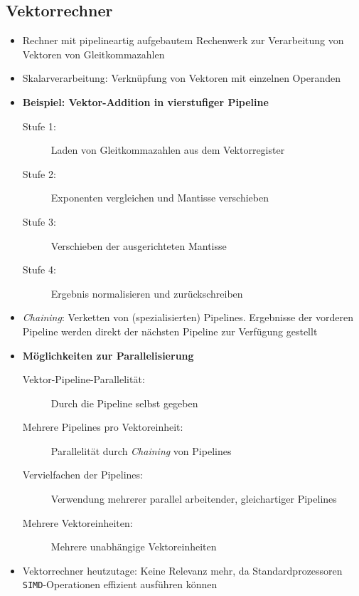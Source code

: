 \subsection{Vektorrechner}
\begin{itemize}
	\item Rechner mit pipelineartig aufgebautem Rechenwerk zur Verarbeitung von Vektoren von Gleitkommazahlen
	\item Skalarverarbeitung: Verknüpfung von Vektoren mit einzelnen Operanden
	\item \textbf{Beispiel: Vektor-Addition in vierstufiger Pipeline}
	\begin{description}
		\item[Stufe 1:] Laden von Gleitkommazahlen aus dem Vektorregister
		\item[Stufe 2:] Exponenten vergleichen und Mantisse verschieben
		\item[Stufe 3:] Verschieben der ausgerichteten Mantisse
		\item[Stufe 4:] Ergebnis normalisieren und zurückschreiben
	\end{description}
	\item \textit{Chaining}: Verketten von (spezialisierten) Pipelines. Ergebnisse der vorderen Pipeline werden direkt der nächsten Pipeline zur Verfügung gestellt
	\item \textbf{Möglichkeiten zur Parallelisierung}
	\begin{description}
		\item[Vektor-Pipeline-Parallelität:] Durch die Pipeline selbst gegeben
		\item[Mehrere Pipelines pro Vektoreinheit:] Parallelität durch \textit{Chaining} von Pipelines
		\item[Vervielfachen der Pipelines:] Verwendung mehrerer parallel arbeitender, gleichartiger Pipelines
		\item[Mehrere Vektoreinheiten:] Mehrere unabhängige Vektoreinheiten
	\end{description}
	\item Vektorrechner heutzutage: Keine Relevanz mehr, da Standardprozessoren \texttt{SIMD}-Operationen effizient ausführen können
\end{itemize}

